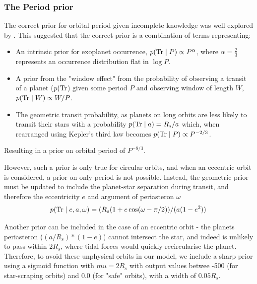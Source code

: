 \documentclass{article}
\begin{document}
\subsubsection{The Period prior}
The correct prior for orbital period given incomplete knowledge was well explored by \citet{Kipping2018}.
This suggested that the correct prior is a combination of terms representing:
\begin{itemize}
    \item An intrinsic prior for exoplanet occurrence, $p({\rm Tr} \mid P) \propto P^\alpha$, where $\alpha=\frac{2}{3}$ represents an occurrence distribution flat in $\log{P}$.
    \item A prior from the "window effect" from the probability of observing a transit of a planet ($p({\rm Tr}$) given some period $P$ and observing window of length $W$, $p({\rm Tr} \mid W) \propto W/P$.
    \item The geometric transit probability, as planets on long orbits are less likely to transit their stars with a probability $p({\rm Tr} \mid a) = R_s/a$ which, when rearranged using Kepler's third law becomes $p({\rm Tr} \mid P) \propto P^{-2/3}$.
\end{itemize}
Resulting in a prior on orbital period of $P^{-8/3}$.

However, such a prior is only true for circular orbits, and when an eccentric orbit is considered, a prior on only period is not possible.
Instead, the geometric prior must be updated to include the planet-star separation during transit, and therefore the eccentricity $e$ and argument of periasteron $\omega$
\begin{equation}
p({\rm Tr} \mid e,a,\omega) = (R_s (1+ e\cos(\omega-\pi/2)) /(a (1-e^2)) \;
\end{equation}

Another prior can be included in the case of an eccentric orbit - the planets periasteron ($(a/R_s)*(1 - e)$) cannot intersect the star, and indeed is unlikely to pass within $2R_s$, where tidal forces would quickly recircularise the planet.
Therefore, to avoid these unphysical orbits in our model, we include a sharp prior using a sigmoid function with $mu = 2R_s$ with output values betwee -500 (for star-scraping orbits) and 0.0 (for "safe" orbits), with a width of $0.05R_s$.
\end{document}
